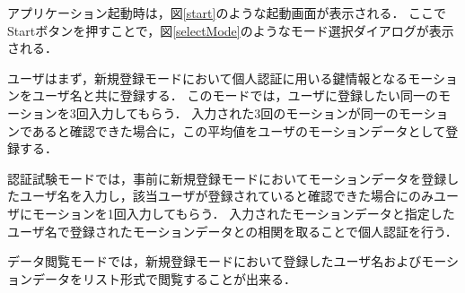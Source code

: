 \documentclass[12pt]{jreport}
\begin{document}
    アプリケーション起動時は，図\ref{start}のような起動画面が表示される．
    ここでStartボタンを押すことで，図\ref{selectMode}のようなモード選択ダイアログが表示される．

    ユーザはまず，新規登録モードにおいて個人認証に用いる鍵情報となるモーションをユーザ名と共に登録する．
    このモードでは，ユーザに登録したい同一のモーションを3回入力してもらう．
    入力された3回のモーションが同一のモーションであると確認できた場合に，この平均値をユーザのモーションデータとして登録する．

    認証試験モードでは，事前に新規登録モードにおいてモーションデータを登録したユーザ名を入力し，該当ユーザが登録されていると確認できた場合にのみユーザにモーションを1回入力してもらう．
    入力されたモーションデータと指定したユーザ名で登録されたモーションデータとの相関を取ることで個人認証を行う．

    データ閲覧モードでは，新規登録モードにおいて登録したユーザ名およびモーションデータをリスト形式で閲覧することが出来る．
\end{document}
